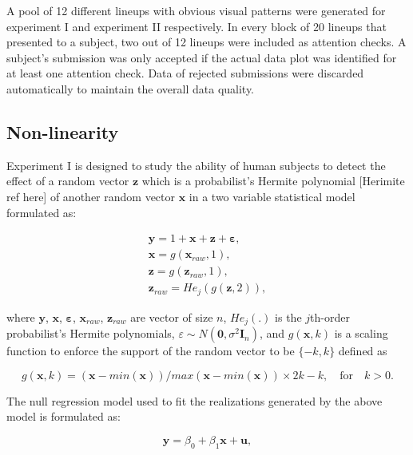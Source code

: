 \documentclass[]{interact}
\theoremstyle{plain}%
\theoremstyle{definition}
\theoremstyle{remark}
\begin{document}
A pool of 12 different lineups with obvious visual patterns were
generated for experiment I and experiment II respectively. In every
block of 20 lineups that presented to a subject, two out of 12 lineups
were included as attention checks. A subject's submission was only
accepted if the actual data plot was identified for at least one
attention check. Data of rejected submissions were discarded
automatically to maintain the overall data quality.

\hypertarget{non-linearity}{%
\subsection{Non-linearity}\label{non-linearity}}

Experiment I is designed to study the ability of human subjects to
detect the effect of a random vector \(\boldsymbol{z}\) which is a
probabilist's Hermite polynomial {[}Herimite ref here{]} of another
random vector \(\boldsymbol{x}\) in a two variable statistical model
formulated as:

\begin{align} \label{eq:nonlinearity-model}
\boldsymbol{y} = 1 + \boldsymbol{x} + \boldsymbol{z} + \boldsymbol{\varepsilon},\\
\boldsymbol{x} = g(\boldsymbol{x}_{raw}, 1), \\
\boldsymbol{z} = g(\boldsymbol{z}_{raw}, 1), \\
\boldsymbol{z}_{raw} = He_j(g(\boldsymbol{z}, 2)),
\end{align}

where \(\boldsymbol{y}\), \(\boldsymbol{x}\),
\(\boldsymbol{\varepsilon}\), \(\boldsymbol{x}_{raw}\),
\(\boldsymbol{z}_{raw}\) are vector of size \(n\), \(He_{j}(.)\) is the
\(j\)th-order probabilist's Hermite polynomials,
\(\varepsilon \sim N(\boldsymbol{0}, \sigma^2\boldsymbol{I}_n)\), and
\(g(\boldsymbol{x}, k)\) is a scaling function to enforce the support of
the random vector to be \(\{-k, k\}\) defined as

\begin{equation} \label{eq:scaling-function}
g(\boldsymbol{x}, k) = (\boldsymbol{x} - min(\boldsymbol{x}))/max(\boldsymbol{x} - min(\boldsymbol{x})) \times 2k - k, \quad \text{for} \quad k > 0. 
\end{equation}

The null regression model used to fit the realizations generated by the
above model is formulated as:

\begin{equation} \label{eq:scaling-function}
\boldsymbol{y} = \beta_0 + \beta_1 \boldsymbol{x} + \boldsymbol{u},
\end{equation}
\end{document}
